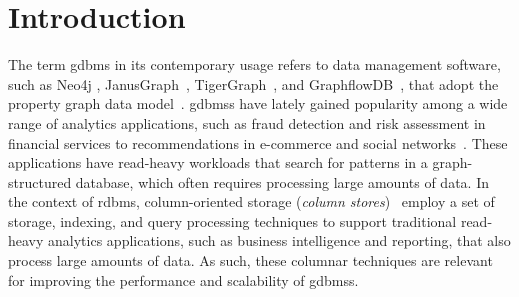 
\chapter{Introduction}
\label{introduction}

The term \gls{gdbms} in its contemporary usage refers to data management software, such as Neo4j \cite{neo4j}, JanusGraph~\cite{janusgraph}, TigerGraph~\cite{tigergraph}, and GraphflowDB~\cite{kankanamge:graphflow, mhedhbi:sqs}, that adopt the property graph data model~\cite{neo4j-property-graph-model}. \gls{gdbms}s have lately gained popularity among a wide range of analytics applications, such as fraud detection and risk assessment in financial services to recommendations in e-commerce and social networks~\cite{sahu:survey}. These applications have read-heavy workloads that search for patterns in a graph-structured database, which often requires processing large amounts of data. In the context of \gls{rdbms}, column-oriented storage ({\em column stores})~\cite{c-store, monetdb, vectorwise, oracle, ziauddin:zone-maps, ms} employ a set of storage, indexing, and query processing techniques to support traditional read-heavy analytics applications, such as business intelligence and reporting, that also process large amounts of data. As such, these columnar techniques are relevant for improving the performance and scalability of \gls{gdbms}s.

